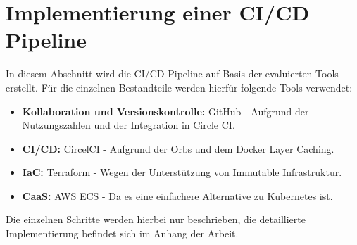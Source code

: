 \section{Implementierung einer CI/CD Pipeline}\label{implementierung}

In diesem Abschnitt wird die CI/CD Pipeline auf Basis der evaluierten Tools erstellt.
Für die einzelnen Bestandteile werden hierfür folgende Tools verwendet:

\begin{itemize}
    \item \textbf{Kollaboration und Versionskontrolle:}
    GitHub - Aufgrund der Nutzungszahlen und der Integration in Circle CI.

    \item \textbf{CI/CD:}
    CircelCI - Aufgrund der Orbs und dem Docker Layer Caching.

    \item \textbf{IaC:}
    Terraform - Wegen der Unterstützung von Immutable Infrastruktur.

    \item \textbf{CaaS:}
    AWS ECS - Da es eine einfachere Alternative zu Kubernetes ist.
\end{itemize}

Die einzelnen Schritte werden hierbei nur beschrieben,
die detaillierte Implementierung befindet sich im Anhang der Arbeit.













